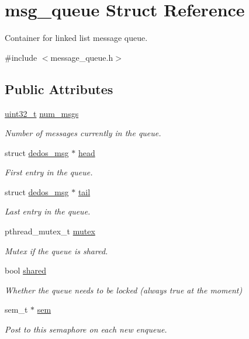 \hypertarget{structmsg__queue}{\section{msg\-\_\-queue Struct Reference}
\label{structmsg__queue}
}


Container for linked list message queue.  




{\ttfamily \#include $<$message\-\_\-queue.\-h$>$}

\subsection*{Public Attributes}
\begin{DoxyCompactItemize}
\item 
\hyperlink{msus_2webserver_2uthash_8h_a435d1572bf3f880d55459d9805097f62}{uint32\-\_\-t} \hyperlink{structmsg__queue_a91a341ed44388ff02304c1165b698372}{num\-\_\-msgs}
\begin{DoxyCompactList}\small\item\em Number of messages currently in the queue. \end{DoxyCompactList}\item 
struct \hyperlink{structdedos__msg}{dedos\-\_\-msg} $\ast$ \hyperlink{structmsg__queue_a66440959ccc8955eae8594a9674511cc}{head}
\begin{DoxyCompactList}\small\item\em First entry in the queue. \end{DoxyCompactList}\item 
struct \hyperlink{structdedos__msg}{dedos\-\_\-msg} $\ast$ \hyperlink{structmsg__queue_a2f86574faae863bc2bf58d3aaa235e23}{tail}
\begin{DoxyCompactList}\small\item\em Last entry in the queue. \end{DoxyCompactList}\item 
pthread\-\_\-mutex\-\_\-t \hyperlink{structmsg__queue_a5218b92f916543130a579ecf1523ad82}{mutex}
\begin{DoxyCompactList}\small\item\em Mutex if the queue is shared. \end{DoxyCompactList}\item 
bool \hyperlink{structmsg__queue_a3cc4b1124f85c79730b77b54ca562d14}{shared}
\begin{DoxyCompactList}\small\item\em Whether the queue needs to be locked (always true at the moment) \end{DoxyCompactList}\item 
sem\-\_\-t $\ast$ \hyperlink{structmsg__queue_a0f479c0b10867953149ee7906b4e9cd5}{sem}
\begin{DoxyCompactList}\small\item\em Post to this semaphore on each new enqueue. \end{DoxyCompactList}\end{DoxyCompactItemize}


